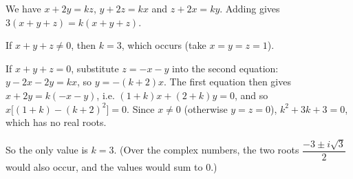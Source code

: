 We have $x+2y=kz$, $y+2z=kx$ and $z+2x=ky$. Adding gives $3(x+y+z)=k(x+y+z)$.

If $x+y+z\ne0$, then $k=3$, which occurs (take $x=y=z=1$).

If $x+y+z=0$, substitute $z=-x-y$ into the second equation: $y-2x-2y=kx$, so $y=-(k+2)x$. The first equation then gives $x+2y=k(-x-y)$, i.e. $(1+k)x+(2+k)y=0$, and so $x\bigl[(1+k)-(k+2)^2\bigr]=0$. Since $x\ne0$ (otherwise $y=z=0$), $k^2+3k+3=0$, which has no real roots.

So the only value is $\boxed{k=3}$. (Over the complex numbers, the two roots $\dfrac{-3\pm i\sqrt3}2$ would also occur, and the values would sum to $0$.)
